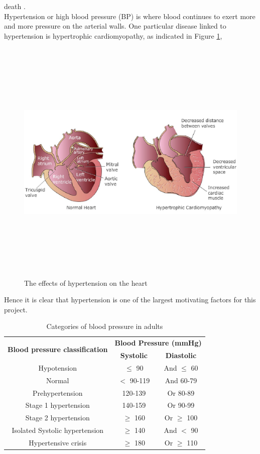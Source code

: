 death \cite{Janjua2017}.\\ \newline \noindent  Hypertension or high blood pressure (BP) is where blood continues to exert more and more pressure on the arterial walls. One particular disease linked to hypertension is hypertrophic cardiomyopathy, as indicated in Figure \ref{hypertension}, \begin{figure}[H]
    \centering
    \includegraphics[width=12cm,height=12cm,keepaspectratio]{Background/hypertension.jpeg}
    \caption{The effects of hypertension on the heart \cite{hypertrophic}}
    \label{hypertension}
\end{figure} \noindent Hence it is clear that hypertension is one of the largest motivating factors for this project.

\begin{table}[H]
    \centering
    \caption{Categories of blood pressure in adults \cite{Wang2018} \cite{Simjanoska20181}}
\begin{tabular}{|c|cc|}
\hline
\multirow{2}{*}{\textbf{Blood pressure classification}} & \multicolumn{2}{c|}{\textbf{Blood Pressure (mmHg)}} \\
 & \textbf{Systolic} & \textbf{Diastolic} \\ \hline
Hypotension & $\le$ 90 & And $\le$ 60 \\
Normal & $<$ 90-119 & And 60-79 \\
Prehypertension & 120-139 & Or 80-89 \\
Stage 1 hypertension & 140-159 & Or 90-99 \\
Stage 2 hypertension & $\ge$ 160 & Or $\ge$ 100 \\ 
Isolated Systolic hypertension & $\ge$ 140 & And $<$ 90\\
Hypertensive crisis & $\ge$ 180 & Or $\ge$ 110 \\ \hline
\end{tabular}
\label{bp_vals_table}
\end{table}


